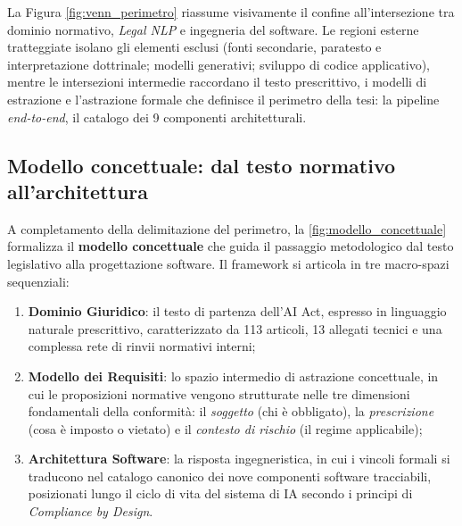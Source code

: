 \documentclass[12pt,a4paper,oneside]{report}
\begin{document}
La Figura \ref{fig:venn_perimetro} riassume visivamente il confine all'intersezione tra dominio normativo, \emph{Legal NLP} e ingegneria del software. Le regioni esterne tratteggiate isolano gli elementi esclusi (fonti secondarie, paratesto e interpretazione dottrinale; modelli generativi; sviluppo di codice applicativo), mentre le intersezioni intermedie raccordano il testo prescrittivo, i modelli di estrazione e l'astrazione formale che definisce il perimetro della tesi: la pipeline \emph{end-to-end}, il catalogo dei 9 componenti architetturali.

\subsection*{Modello concettuale: dal testo normativo all'architettura}

A completamento della delimitazione del perimetro, la \cref{fig:modello_concettuale} formalizza il \textbf{modello concettuale} che guida il passaggio metodologico dal testo legislativo alla progettazione software. Il framework si articola in tre macro-spazi sequenziali:
\begin{enumerate}
    \item \textbf{Dominio Giuridico}: il testo di partenza dell'AI Act, espresso in linguaggio naturale prescrittivo, caratterizzato da 113 articoli, 13 allegati tecnici e una complessa rete di rinvii normativi interni;
    \item \textbf{Modello dei Requisiti}: lo spazio intermedio di astrazione concettuale, in cui le proposizioni normative vengono strutturate nelle tre dimensioni fondamentali della conformità: il \emph{soggetto} (chi è obbligato), la \emph{prescrizione} (cosa è imposto o vietato) e il \emph{contesto di rischio} (il regime applicabile);
    \item \textbf{Architettura Software}: la risposta ingegneristica, in cui i vincoli formali si traducono nel catalogo canonico dei nove componenti software tracciabili, posizionati lungo il ciclo di vita del sistema di IA secondo i principi di \emph{Compliance by Design}.
\end{enumerate}
\end{document}
